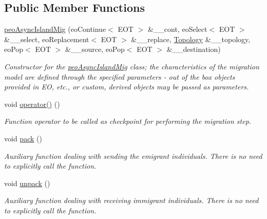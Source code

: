 \subsection*{Public Member Functions}
\begin{CompactItemize}
\item 
\hyperlink{classpeoAsyncIslandMig_e0f706cbf4148d3ca327227a5c7a9fdf}{peo\-Async\-Island\-Mig} (eo\-Continue$<$ EOT $>$ \&\_\-\_\-cont, eo\-Select$<$ EOT $>$ \&\_\-\_\-select, eo\-Replacement$<$ EOT $>$ \&\_\-\_\-replace, \hyperlink{classTopology}{Topology} \&\_\-\_\-topology, eo\-Pop$<$ EOT $>$ \&\_\-\_\-source, eo\-Pop$<$ EOT $>$ \&\_\-\_\-destination)
\begin{CompactList}\small\item\em Constructor for the \hyperlink{classpeoAsyncIslandMig}{peo\-Async\-Island\-Mig} class; the characteristics of the migration model are defined through the specified parameters - out of the box objects provided in EO, etc., or custom, derived objects may be passed as parameters. \item\end{CompactList}\item 
void \hyperlink{classpeoAsyncIslandMig_13581e54425727a7f785ca8a6df527b5}{operator()} ()
\begin{CompactList}\small\item\em Function operator to be called as checkpoint for performing the migration step. \item\end{CompactList}\item 
\hypertarget{classpeoAsyncIslandMig_6d790a5d0b6ac510cac4f61a1c0d8f16}{
void \hyperlink{classpeoAsyncIslandMig_6d790a5d0b6ac510cac4f61a1c0d8f16}{pack} ()}
\label{classpeoAsyncIslandMig_6d790a5d0b6ac510cac4f61a1c0d8f16}

\begin{CompactList}\small\item\em Auxiliary function dealing with sending the emigrant individuals. There is no need to explicitly call the function. \item\end{CompactList}\item 
\hypertarget{classpeoAsyncIslandMig_455501aee5db2bbfbae15779c8429369}{
void \hyperlink{classpeoAsyncIslandMig_455501aee5db2bbfbae15779c8429369}{unpack} ()}
\label{classpeoAsyncIslandMig_455501aee5db2bbfbae15779c8429369}

\begin{CompactList}\small\item\em Auxiliary function dealing with receiving immigrant individuals. There is no need to explicitly call the function. \item\end{CompactList}\end{CompactItemize}
